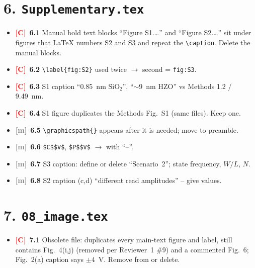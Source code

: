\documentclass[10pt,a4paper]{article}
\newcommand{\C}{\textcolor{red}{\textbf{[C]}}}
\newcommand{\m}{\textcolor{gray}{\textbf{[m]}}}
\begin{document}
\section*{6. \texttt{Supplementary.tex}}
\begin{itemize}
\item \C\ \textbf{6.1} Manual bold text blocks ``Figure S1.\ldots'' and ``Figure S2.\ldots'' sit under figures that LaTeX numbers S2 and S3 and repeat the \verb|\caption|. Delete the manual blocks.
\item \C\ \textbf{6.2} \verb|\label{fig:S2}| used twice $\rightarrow$ second = \texttt{fig:S3}.
\item \C\ \textbf{6.3} S1 caption ``0.85~nm SiO$_2$'', ``$\sim$9~nm HZO'' vs Methods 1.2 / 9.49~nm.
\item \C\ \textbf{6.4} S1 figure duplicates the Methods Fig.~S1 (same files). Keep one.
\item \m\ \textbf{6.5} \verb|\graphicspath{}| appears after it is needed; move to preamble.
\item \m\ \textbf{6.6} \verb|$C$$V$|, \verb|$P$$V$| $\rightarrow$ with ``--''.
\item \m\ \textbf{6.7} S3 caption: define or delete ``Scenario~2''; state frequency, $W/L$, $N$.
\item \m\ \textbf{6.8} S2 caption (c,d) ``different read amplitudes'' -- give values.
\end{itemize}

\section*{7. \texttt{08\_image.tex}}
\begin{itemize}
\item \C\ \textbf{7.1} Obsolete file: duplicates every main-text figure and label, still contains Fig.~4(i,j) (removed per Reviewer~1 \#9) and a commented Fig.~6; Fig.~2(a) caption says $\pm4$~V. Remove from \verb|| or delete.
\end{itemize}

\end{document}
